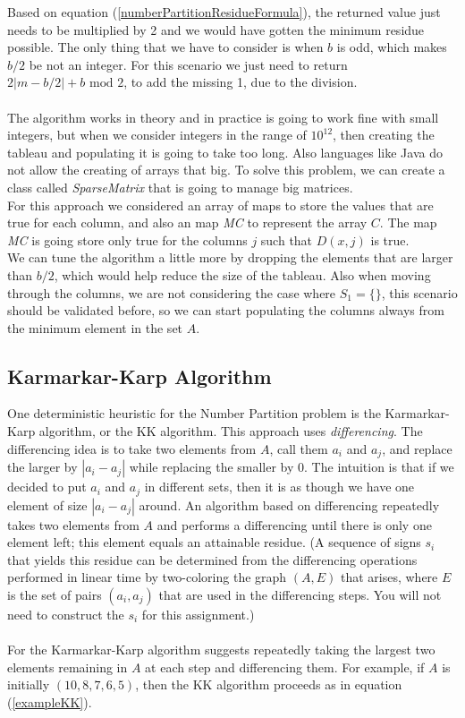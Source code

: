 \documentclass[tikz, 12pt]{scrartcl}
\begin{document}
Based on equation (\ref{numberPartitionResidueFormula}), the returned value  just needs to be multiplied by 2 and we would have gotten the minimum residue possible. The only thing that we have to consider is when $b$ is odd, which makes $b/2$ be not an integer. For this scenario we just need to return $2 |m - b / 2| + b \mbox{ mod } 2$, to add the missing 1, due to the division.\\
\\
The algorithm works in theory and in practice is going to work fine with small integers, but when we consider integers in the range of $10^{12}$, then creating the tableau and populating it is going to take too long. Also languages like Java do not allow the creating of arrays that big. To solve this problem, we can create a class called \textit{SparseMatrix} that is going to manage big matrices.\\
For this approach we considered an array of maps to store the values that are true for each column, and also an map \textit{MC} to represent the array $C$. The map \textit{MC} is going store only true for the columns $j$ such that $D(x,j)$ is true.\\
We can tune the algorithm a little more by dropping the elements that are larger than $b/2$, which would help reduce the size of the tableau. Also when moving through the columns, we are not considering the case where $S_1 = \{ \}$, this scenario should be validated before, so we can start populating the columns always from the minimum element in the set $A$.
\subsection{Karmarkar-Karp Algorithm}

One deterministic heuristic for the Number Partition problem is the Karmarkar-Karp algorithm, or the KK algorithm. This approach uses \textit{differencing}. The differencing idea is to take two elements from $A$, call them $a_i$ and $a_j$, and replace the larger by $|a_i - a_j|$ while replacing the smaller by 0. The intuition is that if we decided to put $a_i$ and $a_j$ in different sets, then it is as though we have one element of size $|a_i - a_j|$ around. An algorithm based on differencing repeatedly takes two elements from $A$ and performs a differencing until there is only one element left; this element equals an attainable residue. (A sequence of signs $s_i$ that yields this residue can be determined from the differencing operations performed in linear time by two-coloring the graph $(A, E)$ that arises, where $E$ is the set of pairs $(a_i, a_j)$ that are used in the differencing steps. You will not need to construct the $s_i$ for this assignment.)\\
\\
For the Karmarkar-Karp algorithm suggests repeatedly taking the largest two elements remaining in $A$ at each step and differencing them. For example, if $A$ is initially $(10, 8, 7, 6, 5)$, then the KK algorithm proceeds as in equation (\ref{exampleKK}).
\end{document}
